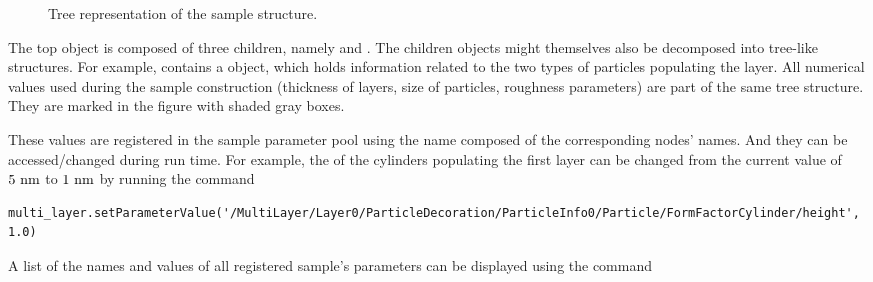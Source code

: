 \begin{figure}[p!]
\caption{Tree representation of the sample structure.}
\label{fig:sample_tree}
\end{figure}


The top  object is composed of three children, namely
 and . The
children objects might themselves also be decomposed into tree-like structures. For example,
 contains a  object, which holds information
related to the two types of particles populating the layer. All numerical values used
during the sample construction (thickness of layers, size of particles, roughness parameters) are part of the same tree structure. 
They are marked in the figure with shaded gray boxes.

These values are registered in the sample parameter pool using the name
composed of the corresponding nodes' names. And they can be accessed/changed
during run time. For example, the  of the cylinders
populating the first layer can be changed from the
current value of $5~\rm{nm}$ to $1~\rm{nm}$ by running the command

\begin{lstlisting}[language=shell, style=commandline]
multi_layer.setParameterValue('/MultiLayer/Layer0/ParticleDecoration/ParticleInfo0/Particle/FormFactorCylinder/height', 1.0)
\end{lstlisting}


A list of the names and values of all registered sample's parameters
can be displayed using the command 

